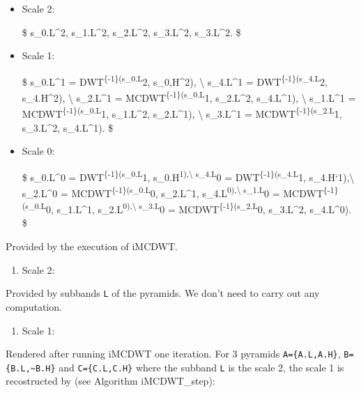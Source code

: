 \begin{itemize}
\item
  Scale 2:

  \$ s\_0.L\^{}2, s\_1.L\^{}2, s\_2.L\^{}2, s\_3.L\^{}2, s\_3.L\^{}2. \$
\item
  Scale 1:

  \$ s\_0.L\^{}1 = DWT\textsuperscript{\{-1\}(s\_0.L}2, s\_0,H\^{}2),
  \textbackslash{} s\_4.L\^{}1 = DWT\textsuperscript{\{-1\}(s\_4.L}2,
  s\_4.H\^{}2), \textbackslash{} s\_2.L\^{}1 =
  MCDWT\textsuperscript{\{-1\}(s\_0.L}1, s\_2.L\^{}2, s\_4.L\^{}1),
  \textbackslash{} s\_1.L\^{}1 = MCDWT\textsuperscript{\{-1\}(s\_0.L}1,
  s\_1.L\^{}2, s\_2.L\^{}1), \textbackslash{} s\_3.L\^{}1 =
  MCDWT\textsuperscript{\{-1\}(s\_2.L}1, s\_3.L\^{}2, s\_4.L\^{}1). \$
\item
  Scale 0:

  \$ s\_0.L\^{}0 = DWT\textsuperscript{\{-1\}(s\_0.L}1,
  s\_0.H\textsuperscript{1),\textbackslash{} s\_4.L}0 =
  DWT\textsuperscript{\{-1\}(s\_4.L}1, s\_4.H`1),\textbackslash{}
  s\_2.L\^{}0 = MCDWT\textsuperscript{\{-1\}(s\_0.L}0, s\_2.L\^{}1,
  s\_4.L\textsuperscript{0),\textbackslash{} s\_1.L}0 =
  MCDWT\textsuperscript{\{-1\}(s\_0.L}0, s\_1.L\^{}1,
  s\_2.L\textsuperscript{0),\textbackslash{} s\_3.L}0 =
  MCDWT\textsuperscript{\{-1\}(s\_2.L}0, s\_3.L\^{}2, s\_4.L\^{}0). \$
\end{itemize}

    Provided by the execution of iMCDWT.

\begin{enumerate}
\def\labelenumi{\arabic{enumi}.}
\tightlist
\item
  Scale 2:
\end{enumerate}

Provided by subbands \texttt{L} of the pyramids. We don't need to carry
out any computation.

\begin{enumerate}
\def\labelenumi{\arabic{enumi}.}
\setcounter{enumi}{1}
\tightlist
\item
  Scale 1:
\end{enumerate}

Rendered after running iMCDWT one iteration. For 3 pyramids
\texttt{A=\{A.L,A.H\}}, \texttt{B=\{B.L,\textasciitilde{}B.H\}} and
\texttt{C=\{C.L,C.H\}} where the subband \texttt{L} is the scale 2, the
scale 1 is recostructed by (see Algorithm iMCDWT\_step):

